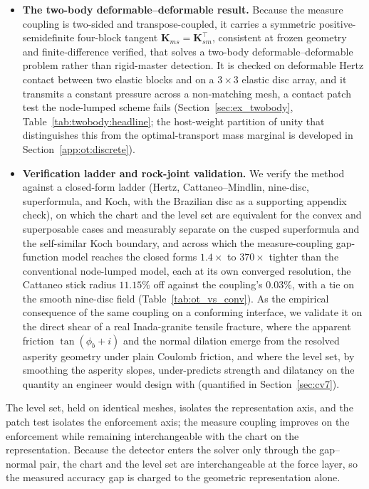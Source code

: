 \documentclass{svjour3}                 %
\begin{document}
\begin{itemize}[leftmargin=*]
\item \textbf{The two-body deformable--deformable result.} Because the measure coupling is two-sided and
transpose-coupled, it carries a symmetric positive-semidefinite four-block tangent $\bm K_{ms}=\bm K_{sm}^{\top}$,
consistent at frozen geometry and finite-difference verified, that solves a two-body
deformable--deformable problem rather than rigid-master detection. It is checked on deformable Hertz contact
between two elastic blocks and on a $3\times3$ elastic disc array, and it transmits a constant pressure across
a non-matching mesh, a contact patch test the node-lumped scheme fails (Section~\ref{sec:ex_twobody},
Table~\ref{tab:twobody:headline}; the host-weight partition of unity that distinguishes this from the
optimal-transport mass marginal is developed in Section~\ref{app:ot:discrete}).

\item \textbf{Verification ladder and rock-joint validation.} We verify the method against a closed-form ladder
(Hertz, Cattaneo--Mindlin, nine-disc, superformula, and Koch, with the Brazilian disc as a supporting appendix
check), on which the chart and the level set are equivalent for the convex and superposable cases and measurably
separate on the cusped superformula and the self-similar Koch boundary, and across which the measure-coupling
gap-function model reaches the closed forms $1.4\times$ to $370\times$ tighter than the conventional node-lumped
model, each at its own converged resolution, the Cattaneo stick radius $11.15\%$ off against the coupling's
$0.03\%$, with a tie on the smooth nine-disc field (Table~\ref{tab:ot_vs_conv}). As the empirical consequence of
the same coupling on a conforming interface, we validate it on the direct shear of a real Inada-granite tensile
fracture, where the apparent friction $\tan(\phi_b+i)$ and the normal dilation emerge from the resolved asperity
geometry under plain Coulomb friction, and where the level set, by smoothing the asperity slopes, under-predicts
strength and dilatancy on the quantity an engineer would design with (quantified in Section~\ref{sec:cv7}).
\end{itemize}

The level set, held on identical meshes, isolates the representation axis, and the patch test isolates the
enforcement axis; the measure coupling improves on the enforcement while remaining interchangeable with the chart
on the representation. Because the detector enters the solver only through the gap--normal pair, the chart and the
level set are interchangeable at the force layer, so the measured accuracy gap is charged to the geometric
representation alone.
\end{document}
